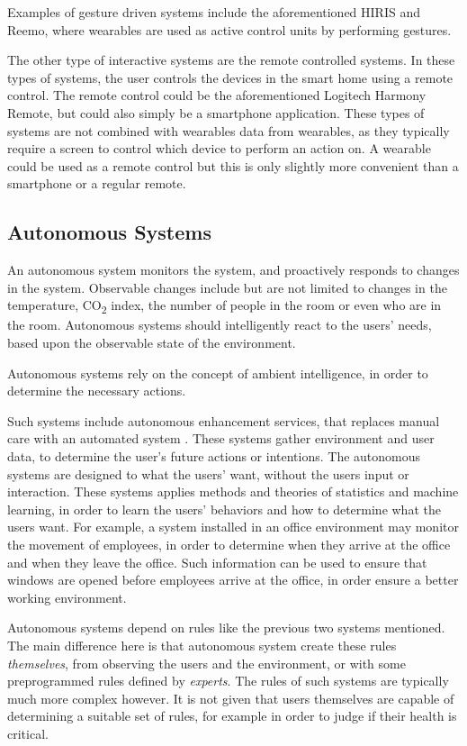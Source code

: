 Examples of gesture driven systems include the aforementioned HIRIS and Reemo, 
where wearables are used as active control units by performing gestures. 

The other type of interactive systems are the remote controlled systems. 
In these types of systems, the user controls the devices in the smart home using a remote control. 
The remote control could be the aforementioned Logitech Harmony Remote, 
but could also simply be a smartphone application. 
These types of systems are not combined with wearables data from wearables, 
as they typically require a screen to control which device to perform an action on.
A wearable could be used as a remote control but this is only slightly more convenient than a smartphone or a regular remote.

\subsection{Autonomous Systems}

An autonomous system monitors the system, 
and proactively responds to changes in the system. 
Observable changes include but are not limited to changes in the temperature, 
CO\textsubscript{2} index, the number of people in the room or even who are in the room.
Autonomous systems should intelligently react to the users' needs, 
based upon the observable state of the environment.

Autonomous systems rely on the concept of ambient intelligence, 
in order to determine the necessary actions.

Such systems include autonomous enhancement services, 
that replaces manual care with an automated system \cite{nehmer2006living}. 
These systems gather environment and user data, 
to determine the user's future actions or intentions. 
The autonomous systems are designed to what the users' want, 
without the users input or interaction. 
These systems applies methods and theories of statistics and machine learning, 
in order to learn the users' behaviors and how to determine what the users want. 
For example, a system installed in an office environment may monitor the movement of employees, 
in order to determine when they arrive at the office and when they leave the office. 
Such information can be used to ensure that windows are opened before employees arrive at the office, 
in order ensure a better working environment.

Autonomous systems depend on rules like the previous two systems mentioned. 
The main difference here is that autonomous system create these rules \emph{themselves}, 
from observing the users and the environment, 
or with some preprogrammed rules defined by \emph{experts}.
The rules of such systems are typically much more complex however. 
It is not given that users themselves are capable of determining a suitable set of rules, 
for example in order to judge if their health is critical. 

